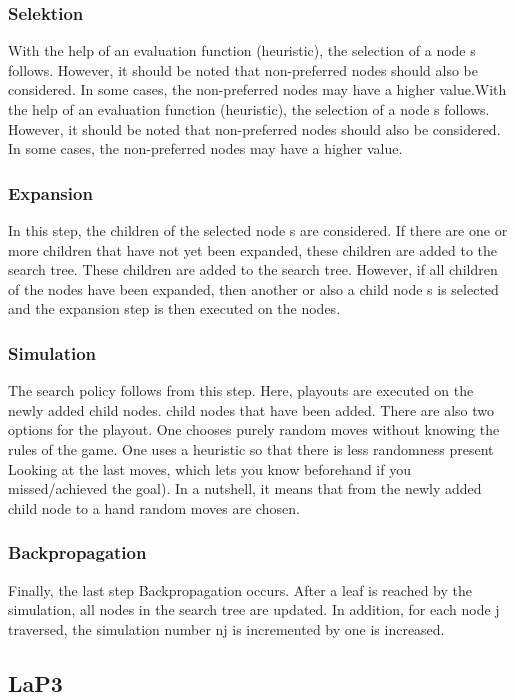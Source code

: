 \documentclass[bibliography=totoc]{scrartcl}
\begin{document}
\subsubsection{Selektion}
With the help of an evaluation function (heuristic), the selection of a node s follows. 
However, it should be noted that non-preferred nodes should also be considered.
In some cases, the non-preferred nodes may have a higher value.With the help of an evaluation function (heuristic), the selection of a node s follows. 
However, it should be noted that non-preferred nodes should also be considered.
In some cases, the non-preferred nodes may have a higher value.

\subsubsection{Expansion} 
In this step, the children of the selected node s are considered. 
If there are one or more children that have not yet been expanded, these children are added to the search tree.
These children are added to the search tree. 
However, if all children of the nodes have been expanded, then another or also a child node s is selected and
the expansion step is then executed on the nodes.

\subsubsection{Simulation} 
The search policy follows from this step. Here, playouts are executed on the newly added child nodes.
child nodes that have been added. There are also two options for the playout.
One chooses purely random moves without knowing the rules of the game.
One uses a heuristic so that there is less randomness present
Looking at the last moves, which lets you know beforehand if you missed/achieved the goal).
In a nutshell, it means that from the newly added child node to a hand
random moves are chosen.

\subsubsection{Backpropagation}
Finally, the last step Backpropagation occurs. After a leaf is reached by the simulation, all nodes in the search tree are updated.
In addition, for each node j traversed, the simulation number nj is incremented by one is increased.

\subsection{LaP3}
\end{document}
